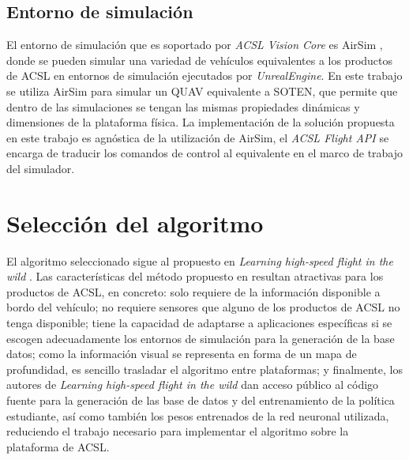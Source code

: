 \subsection{Entorno de simulación}

El entorno de simulación que es soportado por \textit{ACSL Vision Core} es AirSim \cite{shah2018airsim}, donde se pueden simular una variedad de vehículos equivalentes a los productos de ACSL en entornos de simulación ejecutados por \textit{UnrealEngine}. En este trabajo se utiliza AirSim para simular un QUAV equivalente a SOTEN, que permite que dentro de las simulaciones se tengan las mismas propiedades dinámicas y dimensiones de la plataforma física. La implementación de la solución propuesta en este trabajo es agnóstica de la utilización de AirSim, el \textit{ACSL Flight API} se encarga de traducir los comandos de control al equivalente en el marco de trabajo del simulador.

\section{Selección del algoritmo}

\label{sec:imp-algo}

El algoritmo seleccionado sigue al propuesto en \textit{Learning high-speed flight in the wild} \cite{Loquercio2021}. Las características del método propuesto en \cite{Loquercio2021} resultan atractivas para los productos de ACSL, en concreto: solo requiere de la información disponible a bordo del vehículo; no requiere sensores que alguno de los productos de ACSL no tenga disponible; tiene la capacidad de adaptarse a aplicaciones específicas si se escogen adecuadamente los entornos de simulación para la generación de la base datos; como la información visual se representa en forma de un mapa de profundidad, es sencillo trasladar el algoritmo entre plataformas; y finalmente, los autores de \textit{Learning high-speed flight in the wild} dan acceso público al código fuente para la generación de las base de datos y del entrenamiento de la política estudiante, así como también los pesos entrenados de la red neuronal utilizada, reduciendo el trabajo necesario para implementar el algoritmo sobre la plataforma de ACSL.

